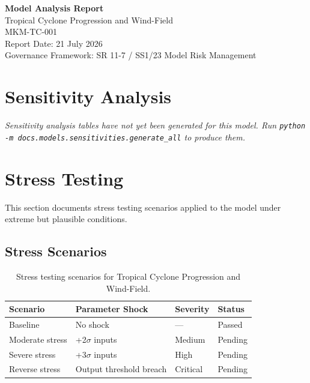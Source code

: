 \documentclass[11pt,a4paper]{article}
\begin{document}
\begin{center}
{\Large\textbf{Model Analysis Report}}\\[6pt]
{\large\textcolor{mkmblue}{Tropical Cyclone Progression and Wind-Field}}\\[4pt]
{\normalsize MKM-TC-001}\\[12pt]
{\small Report Date: 21 July 2026}\\[4pt]
{\footnotesize Governance Framework: SR 11-7 / SS1/23 Model Risk Management}
\end{center}

\vspace{8mm}
\tableofcontents
\newpage

\section{Sensitivity Analysis}

\textit{Sensitivity analysis tables have not yet been generated for this model.
Run \texttt{python -m docs.models.sensitivities.generate\_all} to produce them.}


\section{Stress Testing}

This section documents stress testing scenarios applied to the model
under extreme but plausible conditions.

\subsection{Stress Scenarios}

\begin{table}[H]
    \centering
    \caption{Stress testing scenarios for Tropical Cyclone Progression and Wind-Field.}
    \begin{tabular}{llll}
        \toprule
        \textbf{Scenario} & \textbf{Parameter Shock} & \textbf{Severity} & \textbf{Status} \\
        \midrule
        Baseline & No shock & --- & Passed \\
        Moderate stress & +2$\sigma$ inputs & Medium & Pending \\
        Severe stress & +3$\sigma$ inputs & High & Pending \\
        Reverse stress & Output threshold breach & Critical & Pending \\
        \bottomrule
    \end{tabular}
\end{table}
\end{document}

